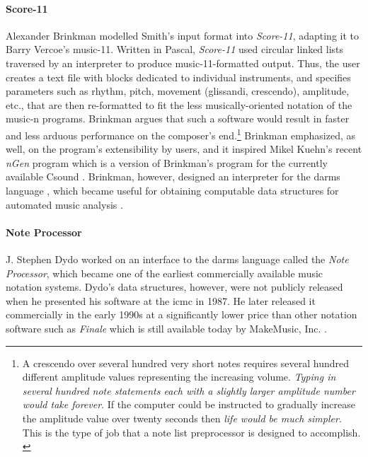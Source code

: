 \paragraph{Score-11}
Alexander Brinkman \parencite{icmc/bbp2372.1981.018} modelled Smith's input format into \textit{Score-11}, adapting it to Barry Vercoe's \gls{music-11}. Written in Pascal, \textit{Score-11} used circular linked lists traversed by an interpreter to produce \gls{music-11}-formatted output. Thus, the user creates a text file with blocks dedicated to individual instruments, and specifies parameters such as rhythm, pitch, movement (glissandi, crescendo), amplitude, etc., that are then re-formatted to fit the less musically-oriented notation of the \gls{music-n} programs. Brinkman argues that such a software would result in faster and less arduous performance on the composer's end.\footnote{A crescendo over several hundred very short notes requires several hundred different amplitude values representing the increasing volume. \textit{Typing in several hundred note statements each with a slightly larger amplitude number would take forever}. If the computer could be instructed to gradually increase the amplitude value over twenty seconds then \textit{life would be much simpler}. This is the type of job that a note list preprocessor is designed to accomplish. \im \parencite{score11manual}} Brinkman emphasized, as well, on the program's extensibility by users, and it inspired Mikel Kuehn's recent \textit{nGen} program which is a version of Brinkman's program for the currently available Csound \parencite{csoundMethods}. Brinkman, however, designed an interpreter for the \gls{darms} language \parencite{icmc/bbp2372.1983.002}, which became useful for obtaining computable data structures for automated music analysis \parencite{icmc/bbp2372.1984.033}. 

\paragraph{Note Processor}
J. Stephen Dydo \parencite{icmc/bbp2372.1987.045} worked on an interface to the \gls{darms} language called the \textit{Note Processor}, which became one of the earliest commercially available music notation systems. Dydo's data structures, however, were not publicly released when he presented his software at the \gls{icmc} in 1987. He later released it commercially in the early 1990s at a significantly lower price than other notation software such as \textit{Finale} which is still available today by MakeMusic, Inc. \parencite{10.2307/941442,10.2307/940555}.

